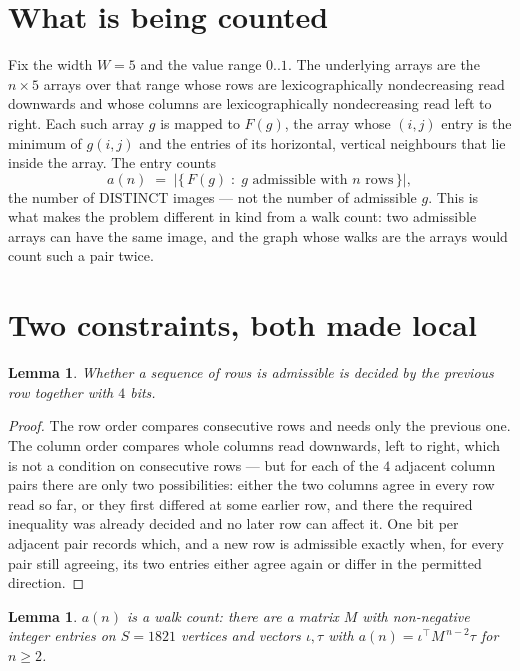 \documentclass[11pt,a4paper]{article}
\theoremstyle{plain}
\newtheorem{lemma}[theorem]{Lemma}
\theoremstyle{definition}
\begin{document}
\section{What is being counted}

Fix the width $W=5$ and the value range $0..1$. The underlying arrays are the
$n\times5$ arrays over that range whose rows are lexicographically nondecreasing read downwards
and whose columns are lexicographically nondecreasing read left to right. Each such array $g$
is mapped to $F(g)$, the array whose $(i,j)$ entry is the minimum of $g(i,j)$ and the entries
of its horizontal, vertical neighbours that lie inside the array. The entry counts
\[
a(n)\;=\;\bigl|\{\,F(g)\;:\;g\text{ admissible with }n\text{ rows}\,\}\bigr|,
\]
the number of DISTINCT images --- not the number of admissible $g$. This is what makes the
problem different in kind from a walk count: two admissible arrays can have the same image, and
the graph whose walks are the arrays would count such a pair twice.

\section{Two constraints, both made local}

\begin{lemma}\label{lem:local}
Whether a sequence of rows is admissible is decided by the previous row together with
$4$ bits.
\end{lemma}

\begin{proof}
The row order compares consecutive rows and needs only the previous one. The column order
compares whole columns read downwards, left to right, which is not a condition on consecutive
rows --- but for each of the $4$ adjacent column pairs there are only two possibilities:
either the two columns agree in every row read so far, or they first differed at some earlier
row, and there the required inequality was already decided and no later row can affect it. One
bit per adjacent pair records which, and a new row is admissible exactly when, for every pair
still agreeing, its two entries either agree again or differ in the permitted direction.
\end{proof}

\begin{lemma}\label{lem:det}
$a(n)$ is a walk count: there are a matrix $M$ with non-negative integer entries on $S=1821$
vertices and vectors $\iota,\tau$ with $a(n)=\iota^{\!\top}M^{\,n-2}\tau$ for $n\ge2$.
\end{lemma}
\end{document}
